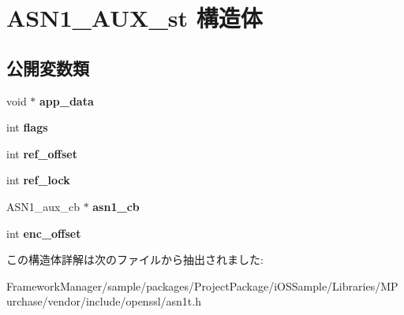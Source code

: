 \hypertarget{struct_a_s_n1___a_u_x__st}{}\section{A\+S\+N1\+\_\+\+A\+U\+X\+\_\+st 構造体}
\label{struct_a_s_n1___a_u_x__st}
\subsection*{公開変数類}
\begin{DoxyCompactItemize}
\item 
\hypertarget{struct_a_s_n1___a_u_x__st_af83d68015a2f496a759c6973b13a9d97}{}void $\ast$ {\bfseries app\+\_\+data}\label{struct_a_s_n1___a_u_x__st_af83d68015a2f496a759c6973b13a9d97}

\item 
\hypertarget{struct_a_s_n1___a_u_x__st_a852e7951bbea693ec9616bac686455c6}{}int {\bfseries flags}\label{struct_a_s_n1___a_u_x__st_a852e7951bbea693ec9616bac686455c6}

\item 
\hypertarget{struct_a_s_n1___a_u_x__st_a7bf75280ea384bfda6f280e97a214f8a}{}int {\bfseries ref\+\_\+offset}\label{struct_a_s_n1___a_u_x__st_a7bf75280ea384bfda6f280e97a214f8a}

\item 
\hypertarget{struct_a_s_n1___a_u_x__st_ab8dd18bd614e4346bae42e2da5046be6}{}int {\bfseries ref\+\_\+lock}\label{struct_a_s_n1___a_u_x__st_ab8dd18bd614e4346bae42e2da5046be6}

\item 
\hypertarget{struct_a_s_n1___a_u_x__st_a1972a608ed6091b6b830839b785b74e8}{}A\+S\+N1\+\_\+aux\+\_\+cb $\ast$ {\bfseries asn1\+\_\+cb}\label{struct_a_s_n1___a_u_x__st_a1972a608ed6091b6b830839b785b74e8}

\item 
\hypertarget{struct_a_s_n1___a_u_x__st_a71b62b72c2eff33605ff2e3f4d833c15}{}int {\bfseries enc\+\_\+offset}\label{struct_a_s_n1___a_u_x__st_a71b62b72c2eff33605ff2e3f4d833c15}

\end{DoxyCompactItemize}


この構造体詳解は次のファイルから抽出されました\+:\begin{DoxyCompactItemize}
\item 
Framework\+Manager/sample/packages/\+Project\+Package/i\+O\+S\+Sample/\+Libraries/\+M\+Purchase/vendor/include/openssl/asn1t.\+h\end{DoxyCompactItemize}
